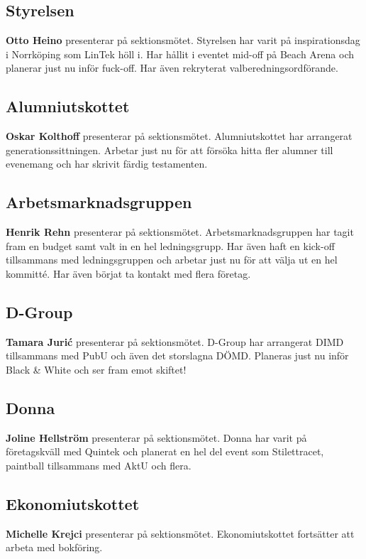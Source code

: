 \documentclass[../protokoll_varmote_2022.tex]{subfiles}
\begin{document}
\subsection{Styrelsen}
\textbf{Otto Heino} presenterar på sektionsmötet.
Styrelsen har varit på inspirationsdag i Norrköping som LinTek höll i. Har hållit i eventet mid-off på Beach Arena och planerar just nu inför fuck-off. Har även rekryterat valberedningsordförande.

\subsection{Alumniutskottet}
\textbf{Oskar Kolthoff} presenterar på sektionsmötet.
Alumniutskottet har arrangerat generationssittningen. Arbetar just nu för att försöka hitta fler alumner till evenemang och har skrivit färdig testamenten.

\subsection{Arbetsmarknadsgruppen}
\textbf{Henrik Rehn} presenterar på sektionsmötet.
Arbetsmarknadsgruppen har tagit fram en budget samt valt in en hel ledningsgrupp. Har även haft en kick-off tillsammans med ledningsgruppen och arbetar just nu för att välja ut en hel kommitté. Har även börjat ta kontakt med flera företag.

\subsection{D-Group}
\textbf{Tamara Jurić} presenterar på sektionsmötet.
D-Group har arrangerat DIMD tillsammans med PubU och även det storslagna DÖMD. Planeras just nu inför Black \& White och ser fram emot skiftet!

\subsection{Donna}
\textbf{Joline Hellström} presenterar på sektionsmötet.
Donna har varit på företagskväll med Quintek och planerat en hel del event som Stilettracet, paintball tillsammans med AktU och flera.

\subsection{Ekonomiutskottet}
\textbf{Michelle Krejci} presenterar på sektionsmötet.
Ekonomiutskottet fortsätter att arbeta med bokföring.
\end{document}
